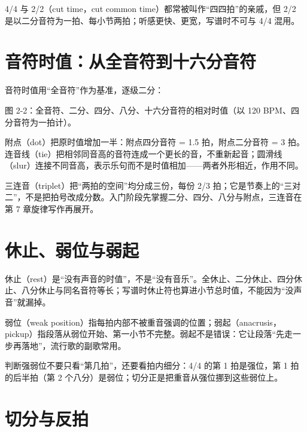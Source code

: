4/4 与 2/2（cut time，cut common time）都常被叫作“四四拍”的亲戚，但 2/2 是以二分音符为一拍、每小节两拍；听感更快、更宽，写谱时不可与 4/4 混用。

\section{音符时值：从全音符到十六分音符}

音符时值用“全音符”作为基准，逐级二分：

\begin{center}

\small 图 2-2：全音符、二分、四分、八分、十六分音符的相对时值（以 120 BPM、四分音符为一拍计）。
\end{center}

附点（dot）把原时值增加一半：附点四分音符 = 1.5 拍，附点二分音符 = 3 拍。连音线（tie）把相邻同音高的音符连成一个更长的音，不重新起音；圆滑线（slur）连接不同音高，表示乐句而不是时值相加——两者外形相近，作用不同。

三连音（triplet）把“两拍的空间”均分成三份，每份 2/3 拍；它是节奏上的“三对二”，不是把拍号改成分数。入门阶段先掌握二分、四分、八分与附点，三连音在第 7 章旋律写作再展开。

\section{休止、弱位与弱起}

休止（rest）是“没有声音的时值”，不是“没有音乐”。全休止、二分休止、四分休止、八分休止与同名音符等长；写谱时休止符也算进小节总时值，不能因为“没声音”就漏掉。

弱位（weak position）指每拍内部不被重音强调的位置；弱起（anacrusis，pickup）指段落从弱位开始、第一小节不完整。弱起不是错误：它让段落“先走一步再落地”，流行歌的副歌常用。

判断强弱位不要只看“第几拍”，还要看拍内细分：4/4 的第 1 拍是强位，第 1 拍的后半拍（第 2 个八分）是弱位；切分正是把重音从强位挪到这些弱位上。

\section{切分与反拍}

